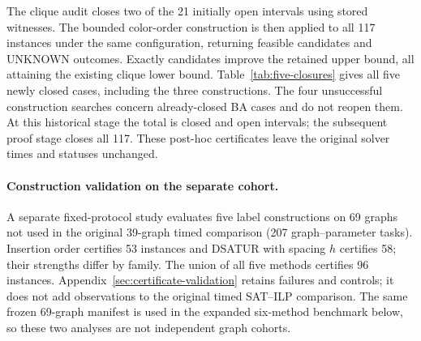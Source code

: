 The clique audit closes two of the 21 initially open intervals using
stored witnesses. The bounded color-order construction is then applied
to all 117 instances under the same configuration, returning
\ConstructionCandidates{} feasible candidates and
\ConstructionUnknown{} UNKNOWN outcomes. Exactly
\ConstructionImproved{} candidates improve the retained upper bound,
all attaining the existing clique lower bound. Table~\ref{tab:five-closures} gives all five newly closed cases,
including the three constructions. The four unsuccessful construction
searches concern already-closed BA cases and do not reopen them.
At this historical stage the total is \ConstructionClosed{} closed and
\ConstructionOpen{} open intervals; the subsequent proof stage closes all 117. These post-hoc certificates leave the original solver
times and statuses unchanged.

\begin{table}[htbp]
\centering\small
\caption{Five intervals closed by combinatorial certificates.}
\label{tab:five-closures}

\end{table}



\paragraph{Construction validation on the separate cohort.}
A separate fixed-protocol study evaluates five label constructions on
69 graphs not used in the original 39-graph timed comparison (207
graph--parameter tasks). Insertion order certifies
53 instances and DSATUR with spacing $h$ certifies 58; their strengths
differ by family. The union of all five methods certifies 96 instances.
Appendix~\ref{sec:certificate-validation} retains failures and controls;
it does not add observations to the original timed SAT--ILP comparison.
The same frozen 69-graph manifest is used in the expanded six-method
benchmark below, so these two analyses are not independent graph cohorts.

